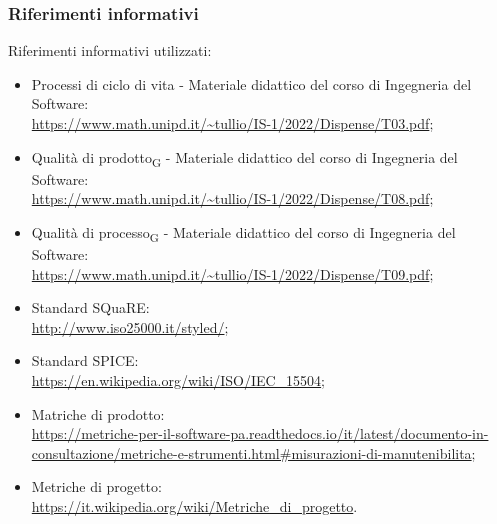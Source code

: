\subsubsection{Riferimenti informativi}
Riferimenti informativi utilizzati:
\begin{itemize}
	\item Processi di ciclo di vita - Materiale didattico del corso di Ingegneria del Software: \\
		\url{https://www.math.unipd.it/~tullio/IS-1/2022/Dispense/T03.pdf};
	\item Qualità di prodotto\textsubscript{G} - Materiale didattico del corso di Ingegneria del Software: \\
		\url{https://www.math.unipd.it/~tullio/IS-1/2022/Dispense/T08.pdf};
	\item Qualità di processo\textsubscript{G} - Materiale didattico del corso di Ingegneria del Software: \\
		\url{https://www.math.unipd.it/~tullio/IS-1/2022/Dispense/T09.pdf};
	\item Standard SQuaRE: \\
		\url{http://www.iso25000.it/styled/};
	\item Standard SPICE: \\
		\url{https://en.wikipedia.org/wiki/ISO/IEC_15504};
	\item Matriche di prodotto: \\
		\url{https://metriche-per-il-software-pa.readthedocs.io/it/latest/documento-in-consultazione/metriche-e-strumenti.html#misurazioni-di-manutenibilita};
	\item Metriche di progetto: \\
		\url{https://it.wikipedia.org/wiki/Metriche_di_progetto}.
\end{itemize}


